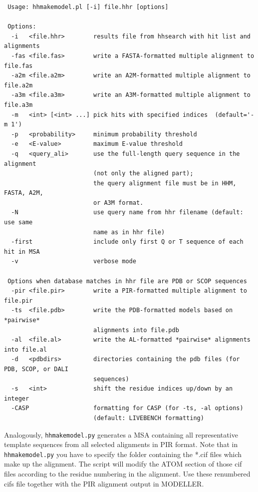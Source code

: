 \documentclass[11pt,a4paper]{article}
\begin{document}
\small 
\begin{verbatim}
 Usage: hhmakemodel.pl [-i] file.hhr [options]

 Options:
  -i   <file.hhr>        results file from hhsearch with hit list and alignments
  -fas <file.fas>        write a FASTA-formatted multiple alignment to file.fas
  -a2m <file.a2m>        write an A2M-formatted multiple alignment to file.a2m
  -a3m <file.a3m>        write an A3M-formatted multiple alignment to file.a3m
  -m   <int> [<int> ...] pick hits with specified indices  (default='-m 1')
  -p   <probability>     minimum probability threshold     
  -e   <E-value>         maximum E-value threshold      
  -q   <query_ali>       use the full-length query sequence in the alignment 
                         (not only the aligned part);
                         the query alignment file must be in HHM, FASTA, A2M,  
                         or A3M format.
  -N                     use query name from hhr filename (default: use same  
                         name as in hhr file)
  -first                 include only first Q or T sequence of each hit in MSA
  -v                     verbose mode

 Options when database matches in hhr file are PDB or SCOP sequences
  -pir <file.pir>        write a PIR-formatted multiple alignment to file.pir 
  -ts  <file.pdb>        write the PDB-formatted models based on *pairwise*  
                         alignments into file.pdb
  -al  <file.al>         write the AL-formatted *pairwise* alignments into file.al
  -d   <pdbdirs>         directories containing the pdb files (for PDB, SCOP, or DALI  
                         sequences)
  -s   <int>             shift the residue indices up/down by an integer           
  -CASP                  formatting for CASP (for -ts, -al options) 
                         (default: LIVEBENCH formatting)
\end{verbatim} 
\normalsize

Analogously, \verb`hhmakemodel.py` generates a MSA containing all representative template sequences from all selected alignments in PIR format. Note that in \verb`hhmakemodel.py` you have to specify the folder containing the *.cif files which make up the alignment. The script will modify the ATOM section of those cif files according to the residue numbering in the alignment. Use these renumbered cifs file together with the PIR alignment output in MODELLER\cite{Sali:1993}.
\end{document}
